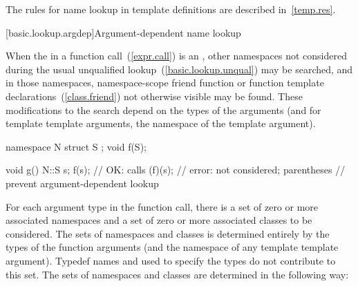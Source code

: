 \pnum
\enternote The rules for name lookup in template definitions are
described in~\ref{temp.res}. \exitnote

[basic.lookup.argdep]{Argument-dependent name lookup}%

\pnum
When the  in
a function call~(\ref{expr.call}) is an , other namespaces not considered
during the usual unqualified lookup~(\ref{basic.lookup.unqual}) may be
searched, and in those namespaces, namespace-scope friend function or
function template declarations~(\ref{class.friend}) not otherwise
visible may be found.
These modifications to the search depend on the types of the arguments
(and for template template arguments, the namespace of the template
argument).
\enterexample

\begin{codeblock}
namespace N {
  struct S { };
  void f(S);
}

void g() {
  N::S s;
  f(s);                         // OK: calls 
  (f)(s);                       // error:  not considered; parentheses
                                // prevent argument-dependent lookup
}
\end{codeblock}

\exitexample

\pnum
For each argument type  in the function call, there is a set of
zero or more associated namespaces and a set of zero or more associated
classes to be considered. The sets of namespaces and classes is
determined entirely by the types of the function arguments (and the
namespace of any template template argument). Typedef names and
 used to specify the types do not
contribute to this set. The sets of namespaces and classes are
determined in the following way:

